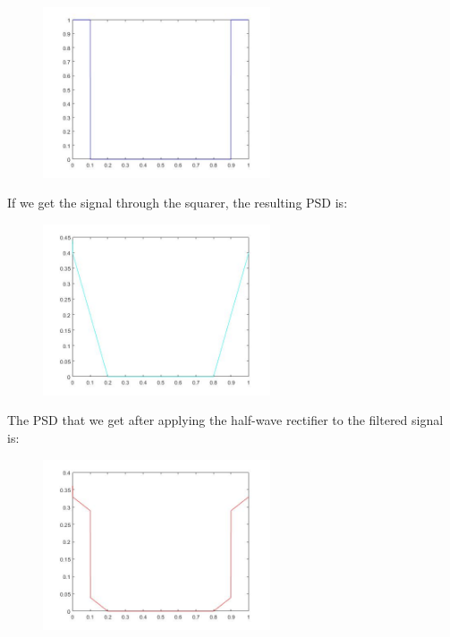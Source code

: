 \documentclass[a4paper,11pt]{article}
\begin{document}
\begin{figure}[!hp]
    \begin{center}
    \includegraphics[width=0.6\textwidth]{images/lab3_figure9_1.jpg}
    \end{center}
\end{figure}

If we get the signal through the squarer, the resulting PSD is:

\begin{figure}[!hp]
    \begin{center}
    \includegraphics[width=0.6\textwidth]{images/lab3_figure9_2.jpg}
    \end{center}
\end{figure}

\newpage

The PSD that we get after applying the half-wave rectifier to the filtered signal is:

\begin{figure}[!hp]
    \begin{center}
    \includegraphics[width=0.6\textwidth]{images/lab3_figure9_3.jpg}
    \end{center}
\end{figure}
\end{document}
